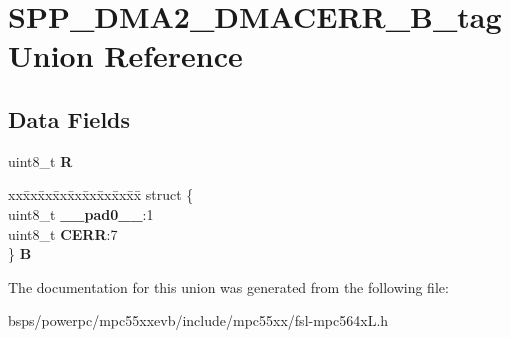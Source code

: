 \hypertarget{unionSPP__DMA2__DMACERR__8B__tag}{}\section{S\+P\+P\+\_\+\+D\+M\+A2\+\_\+\+D\+M\+A\+C\+E\+R\+R\+\_\+B\+\_\+tag Union Reference}
\label{unionSPP__DMA2__DMACERR__8B__tag}
\subsection*{Data Fields}
\begin{DoxyCompactItemize}
\item 
\mbox{\label{unionSPP__DMA2__DMACERR__8B__tag_ad7abe66dab078db22a271d1537a3cfe1}} 
uint8\+\_\+t {\bfseries R}
\item 
\mbox{\label{unionSPP__DMA2__DMACERR__8B__tag_a6bcd363e49d1f33f5b9ce81cf4f18592}} 
\begin{tabbing}
xx\=xx\=xx\=xx\=xx\=xx\=xx\=xx\=xx\=\kill
struct \{\\
\>uint8\_t {\bfseries \_\_pad0\_\_}:1\\
\>uint8\_t {\bfseries CERR}:7\\
\} {\bfseries B}\\

\end{tabbing}\end{DoxyCompactItemize}


The documentation for this union was generated from the following file\+:\begin{DoxyCompactItemize}
\item 
bsps/powerpc/mpc55xxevb/include/mpc55xx/fsl-\/mpc564x\+L.\+h\end{DoxyCompactItemize}
